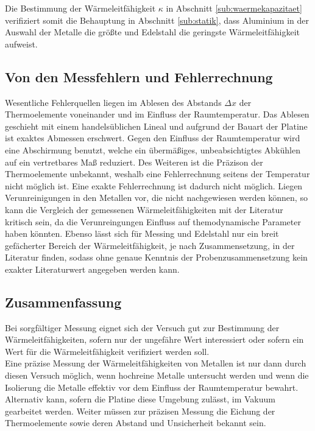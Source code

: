 Die Bestimmung der Wärmeleitfähigkeit $\kappa$ in Abschnitt \ref{sub:waermekapazitaet} verifiziert somit die Behauptung in Abschnitt \ref{sub:statik}, dass Aluminium in der Auswahl der Metalle die größte und Edelstahl die geringste Wärmeleitfähigkeit aufweist.

\subsection{Von den Messfehlern und Fehlerrechnung}
Wesentliche Fehlerquellen liegen im Ablesen des Abstands $\Delta{x}$ der Thermoelemente voneinander und im Einfluss der Raumtemperatur.
Das Ablesen geschieht mit einem handelsüblichen Lineal und aufgrund der Bauart der Platine ist exaktes Abmessen erschwert. 
Gegen den Einfluss der Raumtemperatur wird eine Abschirmung benutzt, welche ein übermäßiges, unbeabsichtigtes Abkühlen auf ein vertretbares Maß reduziert. Des Weiteren ist die Präzison der Thermoelemente unbekannt, weshalb eine Fehlerrechnung seitens der Temperatur nicht möglich ist.
Eine exakte Fehlerrechnung ist dadurch nicht möglich.
Liegen Verunreinigungen in den Metallen vor, die nicht nachgewiesen werden können, so kann die Vergleich der gemessenen Wärmeleitfähigkeiten mit der Literatur kritisch sein, 
da die Verunreingungen Einfluss auf themodynamische Parameter haben könnten. Ebenso lässt sich für Messing und Edelstahl nur ein breit gefächerter Bereich der Wärmeleitfähigkeit, je nach Zusammensetzung, in der Literatur finden, sodass ohne genaue Kenntnis der Probenzusammensetzung kein exakter Literaturwert angegeben werden kann.

\subsection{Zusammenfassung}
Bei sorgfältiger Messung eignet sich der Versuch gut zur Bestimmung der Wärmeleitfähigkeiten, sofern nur der ungefähre Wert interessiert oder sofern ein Wert für die Wärmeleitfähigkeit verifiziert werden soll.\\
Eine präzise Messung der Wärmeleitfähigkeiten von Metallen ist nur dann durch diesen Versuch möglich, wenn hochreine Metalle untersucht werden und wenn die Isolierung die Metalle effektiv vor dem Einfluss der Raumtemperatur bewahrt. 
Alternativ kann, sofern die Platine diese Umgebung zulässt, im Vakuum gearbeitet werden.
Weiter müssen zur präzisen Messung die Eichung der Thermoelemente sowie deren Abstand und Unsicherheit bekannt sein.

